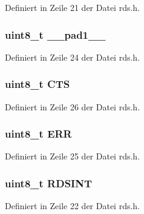 Definiert in Zeile 21 der Datei rds.\+h.

\hypertarget{structstatus_a77f12d2e278bd5c07712648ac0df5e08}{}
\subsubsection[{\+\_\+\+\_\+pad1\+\_\+\+\_\+}]{\setlength{\rightskip}{0pt plus 5cm}uint8\+\_\+t \+\_\+\+\_\+pad1\+\_\+\+\_\+}\label{structstatus_a77f12d2e278bd5c07712648ac0df5e08}


Definiert in Zeile 24 der Datei rds.\+h.

\hypertarget{structstatus_a7f1760325354f291b9a0190e7e355ca8}{}
\subsubsection[{C\+T\+S}]{\setlength{\rightskip}{0pt plus 5cm}uint8\+\_\+t C\+T\+S}\label{structstatus_a7f1760325354f291b9a0190e7e355ca8}


Definiert in Zeile 26 der Datei rds.\+h.

\hypertarget{structstatus_afb74dff3cfacd68c02883e5282ef2f59}{}
\subsubsection[{E\+R\+R}]{\setlength{\rightskip}{0pt plus 5cm}uint8\+\_\+t {\bf E\+R\+R}}\label{structstatus_afb74dff3cfacd68c02883e5282ef2f59}


Definiert in Zeile 25 der Datei rds.\+h.

\hypertarget{structstatus_a4fac7351844086822dbf634529f6cfbd}{}
\subsubsection[{R\+D\+S\+I\+N\+T}]{\setlength{\rightskip}{0pt plus 5cm}uint8\+\_\+t R\+D\+S\+I\+N\+T}\label{structstatus_a4fac7351844086822dbf634529f6cfbd}


Definiert in Zeile 22 der Datei rds.\+h.

\hypertarget{structstatus_a9637ec0bb6d40570ea68a1b96c5d561e}{}
